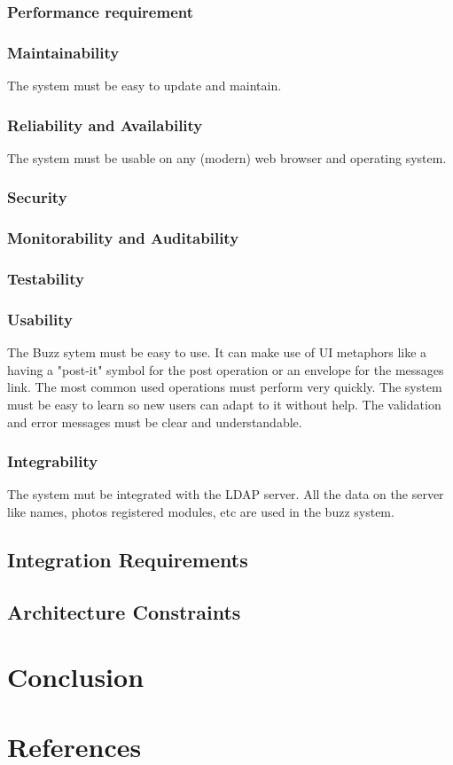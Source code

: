 \documentclass[12pt]{article}
\begin{document}
\subsubsection{Performance requirement}

\subsubsection{Maintainability} 
The system must be easy to update and maintain.
\subsubsection{Reliability and Availability} 
The system must be usable on any (modern) web browser and operating system.
\subsubsection{Security}

\subsubsection{Monitorability and Auditability}

\subsubsection{Testability}

\subsubsection{Usability}
The Buzz sytem must be easy to use. It can make use of UI metaphors like a having a "post-it" symbol for the post operation or an envelope for the messages link.
The most common used operations must perform very quickly. The system must be easy to learn so new users can adapt to it without help. 
The validation and error messages must be clear and understandable.
\subsubsection{Integrability} 
The system mut be integrated with the LDAP server. 
All the data on the server like names, photos registered modules, etc are used in the buzz system. 

\subsection{Integration Requirements}
\subsection{Architecture Constraints}

\section{Conclusion}

\section{References}
\end{document}
